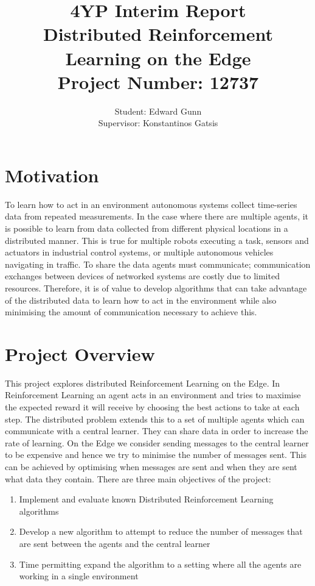 \documentclass[letterpaper,11pt]{article}
\begin{document}
\title{4YP Interim Report \\\textbf{Distributed Reinforcement Learning on the Edge} \\ Project Number: 12737}
\author{Student: Edward Gunn \\Supervisor: Konstantinos Gatsis}
\maketitle

\section{Motivation}

To learn how to act in an environment autonomous systems collect time-series data from repeated measurements. 
In the case where there are multiple agents, it is possible to learn from data collected from different physical locations in a distributed manner. 
This is true for multiple robots executing a task, sensors and actuators in industrial control systems, or multiple autonomous vehicles navigating in traffic. 
To share the data agents must communicate; communication exchanges between devices of networked systems are costly due to limited resources.
Therefore, it is of value to develop algorithms that can take advantage of the distributed data to learn how to act in the environment while also minimising the amount of communication necessary to achieve this.


\section{Project Overview}

This project explores distributed Reinforcement Learning on the Edge.
In Reinforcement Learning an agent acts in an environment and tries to maximise the expected reward it will receive by choosing the best actions to take at each step.
The distributed problem extends this to a set of multiple agents which can communicate with a central learner.
They can share data in order to increase the rate of learning.
On the Edge we consider sending messages to the central learner to be expensive and hence we try to minimise the number of messages sent.
This can be achieved by optimising when messages are sent and when they are sent what data they contain.
There are three main objectives of the project:
\begin{enumerate}

	\item Implement and evaluate known Distributed Reinforcement Learning algorithms \label{one}

	\item Develop a new algorithm to attempt to reduce the number of messages that are sent between the agents and the central learner \label{two}

	\item Time permitting expand the algorithm to a setting where all the agents are working in a single environment \label{three}

\end{enumerate}
\end{document}
